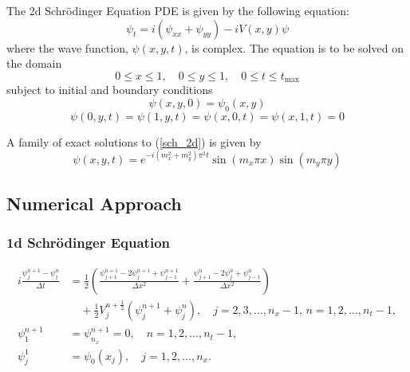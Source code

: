 \documentclass[10pt]{article}
\begin{document}
The 2d Schrödinger Equation PDE is given by the following equation:
\begin{equation}\label{sch_2d}
\psi_t = i(\psi_{xx} + \psi_{yy}) - iV(x,y)\psi
\end{equation}
where the wave function, $\psi(x,y,t)$, is complex. The equation is to be solved on the domain
$$0\leq x \leq 1, \quad 0 \leq y \leq 1, \quad 0\leq t \leq t_{\textrm{max}}$$
subject to initial and boundary conditions
\begin{equation}\label{sch_2d_IC}
\psi(x,y,0) = \psi_0(x,y)
\end{equation}
\begin{equation}\label{sch_2_BC}
\psi(0,y,t) = \psi(1,y,t) = \psi(x,0,t) = \psi(x,1,t) = 0
\end{equation}

A family of exact solutions to (\ref{sch_2d}) is given by
\begin{equation}\label{2d_exact_soln}
\psi(x,y,t) = e^{-i (m_x^2 + m_y^2) \pi^2 t} \sin(m_x \pi x) \sin(m_y \pi y)
\end{equation}

\subsection*{Numerical Approach}

\subsubsection*{1d Schrödinger Equation}

\begin{align}
    i \frac{\psi_j^{n+1} - \psi_j^n}{\Delta t} &= \frac{1}{2} \left( 
    \frac{\psi_{j+1}^{n+1} - 2\psi_j^{n+1} + \psi_{j-1}^{n+1}}{\Delta x^2} 
    + \frac{\psi_{j+1}^n - 2\psi_j^n + \psi_{j-1}^n}{\Delta x^2} \right) \\
    &\quad + \frac{1}{2} V_j^{n+\frac{1}{2}} \left(\psi_j^{n+1} + \psi_j^n \right), \quad j = 2, 3, \dots, n_x - 1, \, n = 1, 2, \dots, n_t - 1, \\[10pt]
    \psi_1^{n+1} &= \psi_{n_x}^{n+1} = 0, \quad n = 1, 2, \dots, n_t - 1, \\[10pt]
    \psi_j^1 &= \psi_0(x_j), \quad j = 1, 2, \dots, n_x.
\end{align}
\end{document}

